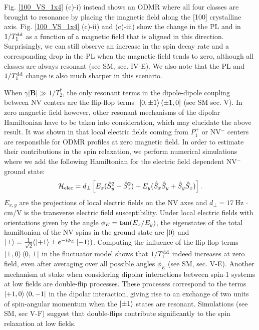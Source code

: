 \documentclass[preprintnumbers,amsmath,amssymb,superscriptaddress,twocolumn,showpacs]{revtex4-2}
\begin{document}
Fig. \ref{100_VS_1x4} (c)-i) instead shows an ODMR where all four classes are brought to resonance by placing the magnetic field along the [100] crystalline axis. Fig. \ref{100_VS_1x4} (c)-ii) and (c)-iii) show the change in the PL and in $1/T_1^{\rm dd}$ as a function of a magnetic field that is aligned in this direction. Surprisingly, we can still observe an increase in the spin decay rate and a corresponding drop in the PL when the magnetic field tends to zero, although all classes are always resonant (see SM, sec. IV-E).
We also note that the PL and $1/T_1^{\rm dd}$ change is also much sharper in this scenario.

When $\gamma | \mathbf{B} |\gg 1/T_2^*$, the only resonant terms in the dipole-dipole coupling between NV centers are the flip-flop terms $~\ket{0,\pm 1}\bra{\pm 1,0}$ (see SM sec. V).
In zero magnetic field however, other resonant mechanisms of the dipolar Hamiltonian have to be taken into consideration, which may elucidate the above result.
It was shown in  \cite{mittiga2018imaging} that local electric fields coming from $P_1^+$ or NV$^-$ centers are responsible for ODMR profiles at zero magnetic field. %
In order to estimate their contributions in the spin relaxation, we perform numerical simulations where we add the following Hamiltonian for the electric field dependent NV$^-$ ground state: 
\begin{equation}
\label{NV Hamiltonian}
\mathcal{H}_{\rm elec}= d_\perp \left[ E_x(\hat S_y^2-\hat S_x^2) + E_y(\hat S_x \hat S_y+\hat S_y \hat S_x) \right].
\end{equation}
$E_{x,y}$ are the projections of local electric fields on the NV axes and $d_\perp=17~$Hz $\cdot$ cm/V is the transverse electric field susceptibility. 
Under local electric fields with orientations given by the angle $\phi_E={\rm tan}(E_x/E_y)$, the eigenstates of the total hamiltonian of the NV spins in the ground state are $\ket{0}$ and $\ket{\pm}=\frac{1}{\sqrt{2}}(\ket{+1}\pm e^{-i\phi_E}\ket{-1})$.
Computing the influence of the flip-flop terms $\ket{\pm,0} \bra{0,\pm} $ in the fluctuator model shows that $1/T_1^{\rm dd}$ indeed increases at zero field, even after averaging over all possible angles $\phi_E$ (see SM, sec. V-E).  Another mechanism at stake when considering dipolar interactions between spin-1 systems at low fields are double-flip processes. 
These processes correspond to the terms $\ket{+1,0} \bra{0,-1}$ in the dipolar interaction, giving rise to an exchange of two units of spin-angular momentum when the $\ket{\pm 1}$ states are resonant. Simulations (see SM, sec V-F) suggest that double-flips contribute significantly to the spin relaxation at low fields.
\end{document}
